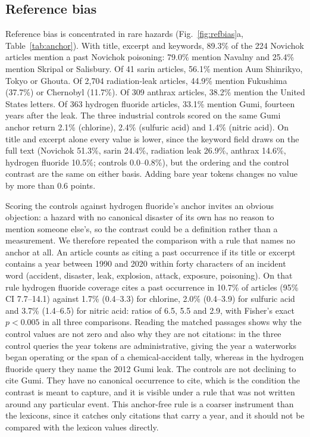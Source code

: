 \documentclass[1p,times]{elsarticle}
\begin{document}
\subsection{Reference bias}
\label{sec:refbias}
Reference bias is concentrated in rare hazards (Fig.~\ref{fig:refbias}a, Table~\ref{tab:anchor}). With title, excerpt and keywords, 89.3\% of the 224 Novichok articles mention a past Novichok poisoning: 79.0\% mention Navalny and 25.4\% mention Skripal or Salisbury. Of 41 sarin articles, 56.1\% mention Aum Shinrikyo, Tokyo or Ghouta. Of 2,704 radiation-leak articles, 44.9\% mention Fukushima (37.7\%) or Chernobyl (11.7\%). Of 309 anthrax articles, 38.2\% mention the United States letters. Of 363 hydrogen fluoride articles, 33.1\% mention Gumi, fourteen years after the leak. The three industrial controls scored on the same Gumi anchor return 2.1\% (chlorine), 2.4\% (sulfuric acid) and 1.4\% (nitric acid). On title and excerpt alone every value is lower, since the keyword field draws on the full text (Novichok 51.3\%, sarin 24.4\%, radiation leak 26.9\%, anthrax 14.6\%, hydrogen fluoride 10.5\%; controls 0.0--0.8\%), but the ordering and the control contrast are the same on either basis. Adding bare year tokens changes no value by more than 0.6 points.

Scoring the controls against hydrogen fluoride's anchor invites an obvious objection: a hazard with no canonical disaster of its own has no reason to mention someone else's, so the contrast could be a definition rather than a measurement. We therefore repeated the comparison with a rule that names no anchor at all. An article counts as citing a past occurrence if its title or excerpt contains a year between 1990 and 2020 within forty characters of an incident word (accident, disaster, leak, explosion, attack, exposure, poisoning). On that rule hydrogen fluoride coverage cites a past occurrence in 10.7\% of articles (95\% CI 7.7--14.1) against 1.7\% (0.4--3.3) for chlorine, 2.0\% (0.4--3.9) for sulfuric acid and 3.7\% (1.4--6.5) for nitric acid: ratios of 6.5, 5.5 and 2.9, with Fisher's exact $p < 0.005$ in all three comparisons. Reading the matched passages shows why the control values are not zero and also why they are not citations: in the three control queries the year tokens are administrative, giving the year a waterworks began operating or the span of a chemical-accident tally, whereas in the hydrogen fluoride query they name the 2012 Gumi leak. The controls are not declining to cite Gumi. They have no canonical occurrence to cite, which is the condition the contrast is meant to capture, and it is visible under a rule that was not written around any particular event. This anchor-free rule is a coarser instrument than the lexicons, since it catches only citations that carry a year, and it should not be compared with the lexicon values directly.
\end{document}
